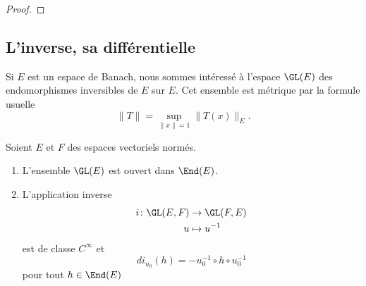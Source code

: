 \begin{proof}
%
%
\end{proof}
\subsection{L'inverse, sa différentielle}

Si \( E\) est un espace de Banach, nous sommes intéressé à l'espace \( \GL(E)\) des endomorphismes inversibles de \( E\) sur \( E\). Cet ensemble est métrique par la formule usuelle
\begin{equation}
    \| T \|=\sup_{\| x \|=1}\| T(x) \|_E.
\end{equation}

\begin{theorem}    \label{ThoCINVBTJ}
    Soient \( E\) et \( F\) des espaces vectoriels normés.
    \begin{enumerate}
        \item
        L'ensemble \( \GL(E)\) est ouvert dans \( \End(E)\).
    \item
        L'application inverse
    \begin{equation}
        \begin{aligned}
        i\colon \GL(E,F)&\to \GL(F,E) \\
        u&\mapsto u^{-1} 
        \end{aligned}
    \end{equation}
    est de classe \( C^{\infty}\) et
    \begin{equation}
        di_{u_0}(h)=-u_0^{-1}\circ h\circ u_0^{-1}
    \end{equation}
    pour tout \( h\in\End(E)\)
    \end{enumerate}
\end{theorem}

